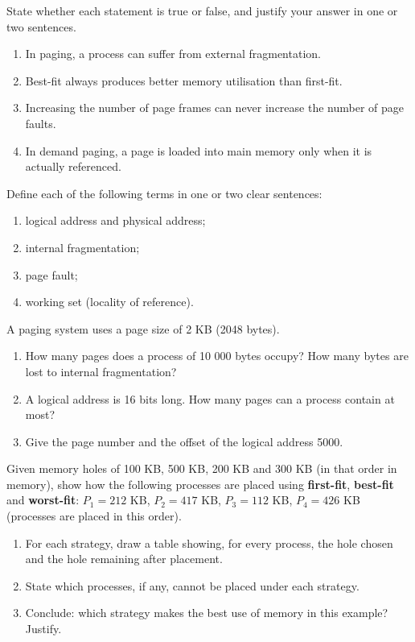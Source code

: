\documentclass[11pt]{article}
\newcounter{popsec}
\newcounter{popsub}
\newcommand{\courssub}[1]{%
  \stepcounter{popsub}%
  \par\vspace{9pt}\noindent{\popxbold\fontsize{11.5}{13}\selectfont\color{popink}{\color{poporange}\thepopsec.\thepopsub}\hspace{6pt}#1}\par\nopagebreak\vspace{4pt}
}
\begin{document}
\begin{exercice}
State whether each statement is true or false, and justify your answer in one or two sentences.
\begin{enumerate}
\item In paging, a process can suffer from external fragmentation.
\item Best-fit always produces better memory utilisation than first-fit.
\item Increasing the number of page frames can never increase the number of page faults.
\item In demand paging, a page is loaded into main memory only when it is actually referenced.
\end{enumerate}
\end{exercice}

\begin{exercice}[Definitions]
Define each of the following terms in one or two clear sentences:
\begin{enumerate}
\item logical address and physical address;
\item internal fragmentation;
\item page fault;
\item working set (locality of reference).
\end{enumerate}
\end{exercice}

\begin{exercice}
A paging system uses a page size of 2 KB (2048 bytes).
\begin{enumerate}
\item How many pages does a process of 10 000 bytes occupy? How many bytes are lost to internal fragmentation?
\item A logical address is 16 bits long. How many pages can a process contain at most?
\item Give the page number and the offset of the logical address 5000.
\end{enumerate}
\end{exercice}

\courssub{I practise}

\begin{exercice}
Given memory holes of 100 KB, 500 KB, 200 KB and 300 KB (in that order in memory), show how the following processes are placed using \textbf{first-fit}, \textbf{best-fit} and \textbf{worst-fit}: $P_1 = 212$ KB, $P_2 = 417$ KB, $P_3 = 112$ KB, $P_4 = 426$ KB (processes are placed in this order).
\begin{enumerate}
\item For each strategy, draw a table showing, for every process, the hole chosen and the hole remaining after placement.
\item State which processes, if any, cannot be placed under each strategy.
\item Conclude: which strategy makes the best use of memory in this example? Justify.
\end{enumerate}
\end{exercice}
\end{document}
